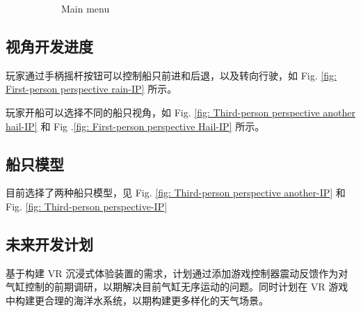 \documentclass[a4paper,10pt]{article}
\begin{document}
\begin{figure}[htbp]
\begin{subfigure}{0.3\textwidth}
				\captionsetup{font=scriptsize}
				\caption{Main menu}
				\label{fig: Main menu-IP}	
			\end{subfigure}
			
			\captionsetup{font=scriptsize}
			\caption{
				\label{fig: Scene}						
			}
		\end{figure}
	
		\subsection{视角开发进度}
		
		玩家通过手柄摇杆按钮可以控制船只前进和后退，以及转向行驶，如 Fig. \ref{fig: First-person perspective rain-IP} 所示。
		
		玩家开船可以选择不同的船只视角，如 Fig. \ref{fig: Third-person perspective another hail-IP} 和 Fig .\ref{fig: First-person perspective Hail-IP} 所示。
		
		\subsection{船只模型}
		
		目前选择了两种船只模型，见 Fig. \ref{fig: Third-person perspective another-IP} 和 Fig. \ref{fig: Third-person perspective-IP}
		
		\subsection{未来开发计划}
		
		基于构建 VR 沉浸式体验装置的需求，计划通过添加游戏控制器震动反馈作为对气缸控制的前期调研，以期解决目前气缸无序运动的问题。同时计划在 VR 游戏中构建更合理的海洋水系统，以期构建更多样化的天气场景。		
		

	
	
\end{document}

